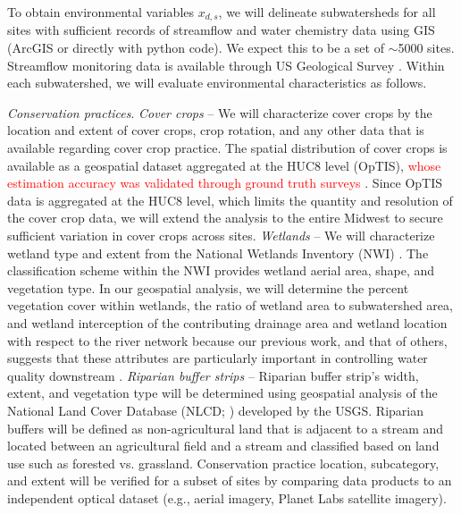 \documentclass[12pt, class=article, crop=false]{standalone}
\begin{document}
To obtain environmental variables $x_{d,s}$, we will delineate subwatersheds for all sites with sufficient records of streamflow and water chemistry data using GIS (ArcGIS or directly with python code).
We expect this to be a set of $\sim$5000 sites. Streamflow monitoring data is available through US Geological Survey \citep{us_geological_survey_national_2001}.
Within each subwatershed, we will evaluate environmental characteristics as follows.

\textit{Conservation practices}.
\textit{Cover crops} -- We will characterize cover crops by the location and extent of cover crops, crop rotation, and any other data that is available regarding cover crop practice. 
The spatial distribution of cover crops is available as a geospatial dataset aggregated at the HUC8 level (OpTIS), \textcolor{red}{whose estimation accuracy was validated through ground truth surveys} \citep{the_nature_conservancy_optis_2023}.
Since OpTIS data is aggregated at the HUC8 level, which limits the quantity and resolution of the cover crop data, we will extend the analysis to the entire Midwest to secure sufficient variation in cover crops across sites.
\textit{Wetlands} -- We will characterize wetland type and extent from the National Wetlands Inventory (NWI) \citep{us_fish_and_wildlife_service_national_2024}.
The classification scheme within the NWI provides wetland aerial area, shape, and vegetation type.
In our geospatial analysis, we will determine the percent vegetation cover within wetlands, the ratio of wetland area to subwatershed area, and wetland interception of the contributing drainage area and wetland location with respect to the river network because our previous work, and that of others, suggests that these attributes are particularly important in controlling water quality downstream \citep{hansen_coupling_2016, cheng_maximizing_2020}.
\textit{Riparian buffer strips} -- Riparian buffer strip's width, extent, and vegetation type will be determined using geospatial analysis of the National Land Cover Database (NLCD; \citep{wickham_thematic_2021, wickham_thematic_2023}) developed by the USGS. Riparian buffers will be defined as non-agricultural land that is adjacent to a stream and located between an agricultural field and a stream and classified based on land use such as forested vs. grassland. Conservation practice location, subcategory, and extent will be verified for a subset of sites by comparing data products to an independent optical dataset (e.g., aerial imagery, Planet Labs satellite imagery).
\end{document}
